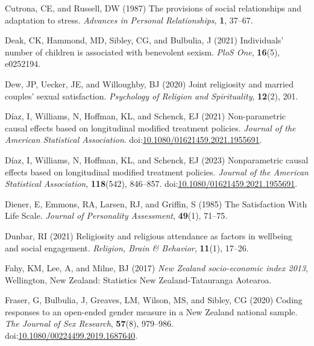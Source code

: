 \documentclass[
  single column]{article}
\newlength{\cslhangindent}
\newenvironment{CSLReferences}[2] %
 {\begin{list}{}{%
  \setlength{\itemindent}{0pt}
  \setlength{\leftmargin}{0pt}
  \setlength{\parsep}{0pt}
  \ifodd #1
   \setlength{\leftmargin}{\cslhangindent}
   \setlength{\itemindent}{-1\cslhangindent}
  \fi
  \setlength{\itemsep}{#2\baselineskip}}}
 {\end{list}}
\begin{document}
\begin{CSLReferences}{1}{0}
Cutrona, CE, and Russell, DW (1987) The provisions of social
relationships and adaptation to stress. \emph{Advances in Personal
Relationships}, \textbf{1}, 37--67.

Deak, CK, Hammond, MD, Sibley, CG, and Bulbulia, J (2021) Individuals'
number of children is associated with benevolent sexism. \emph{PloS
One}, \textbf{16}(5), e0252194.

Dew, JP, Uecker, JE, and Willoughby, BJ (2020) Joint religiosity and
married couples' sexual satisfaction. \emph{Psychology of Religion and
Spirituality}, \textbf{12}(2), 201.

Díaz, I, Williams, N, Hoffman, KL, and Schenck, EJ (2021) Non-parametric
causal effects based on longitudinal modified treatment policies.
\emph{Journal of the American Statistical Association}.
doi:\href{https://doi.org/10.1080/01621459.2021.1955691}{10.1080/01621459.2021.1955691}.

Díaz, I, Williams, N, Hoffman, KL, and Schenck, EJ (2023) Nonparametric
causal effects based on longitudinal modified treatment policies.
\emph{Journal of the American Statistical Association},
\textbf{118}(542), 846--857.
doi:\href{https://doi.org/10.1080/01621459.2021.1955691}{10.1080/01621459.2021.1955691}.

Diener, E, Emmons, RA, Larsen, RJ, and Griffin, S (1985) The
Satisfaction With Life Scale. \emph{Journal of Personality Assessment},
\textbf{49}(1), 71--75.

Dunbar, RI (2021) Religiosity and religious attendance as factors in
wellbeing and social engagement. \emph{Religion, Brain \& Behavior},
\textbf{11}(1), 17--26.

Fahy, KM, Lee, A, and Milne, BJ (2017) \emph{{N}ew {Z}ealand
socio-economic index 2013}, Wellington, New Zealand: Statistics New
Zealand-Tatauranga Aotearoa.

Fraser, G, Bulbulia, J, Greaves, LM, Wilson, MS, and Sibley, CG (2020)
Coding responses to an open-ended gender measure in a {N}ew {Z}ealand
national sample. \emph{The Journal of Sex Research}, \textbf{57}(8),
979--986.
doi:\href{https://doi.org/10.1080/00224499.2019.1687640}{10.1080/00224499.2019.1687640}.


\end{CSLReferences}
\end{document}
